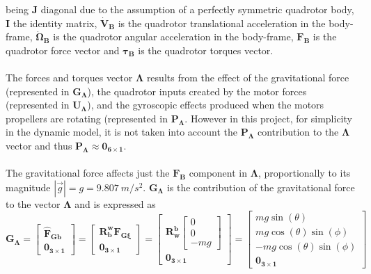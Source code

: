 being $\mathbf{J}$ diagonal due to the assumption of a perfectly symmetric quadrotor body, $\mathbf{I}$ the identity matrix, $\mathbf{\dot{V}_{B}}$ is the quadrotor translational acceleration in the body-frame, $\mathbf{\dot{\Omega}_B}$ is the quadrotor angular acceleration in the body-frame, $\mathbf{F_{B}}$ is the quadrotor force vector and $\mathbf{\tau_{B}}$ is the quadrotor torques vector.
\\\\
The forces and torques vector $\mathbf{\Lambda}$ results from the effect of the gravitational force (represented in $\mathbf{G_{\Lambda}}$), the quadrotor inputs created by the motor forces (represented in $\mathbf{U_{\Lambda}}$), and the gyroscopic effects produced when the motors propellers are rotating (represented in $\mathbf{P_{\Lambda}}$. However in this project, for simplicity in the dynamic model, it is not taken into account the $\mathbf{P_{\Lambda}}$ contribution to the $\mathbf{\Lambda}$ vector and thus $\mathbf{P_{\Lambda}} \approx \mathbf{0_{6\times 1}}$.
\\\\
The gravitational force affects just the $\mathbf{F_B}$ component in $\mathbf{\Lambda}$, proportionally to its magnitude $|\vec{g}|= g = 9.807\ m/s^{2}$. $\mathbf{G_{\Lambda}}$ is the contribution of the gravitational force to the vector $\mathbf{\Lambda}$ and is expressed as 
\begin{equation}
\mathbf{G_{\Lambda}}= \begin{bmatrix}
\mathbf{\hat{F}_{Gb}} \\ \mathbf{0_{3\times 1}}
\end{bmatrix} = \begin{bmatrix}
\mathbf{R_{b}^{w}}\mathbf{F_{G\xi}} \\ \mathbf{0_{3\times 1}}
\end{bmatrix} = 
\begin{bmatrix}
\mathbf{R_{w}^{b}} 
\begin{bmatrix}
0 \\[5pt] 0 \\[5pt] -m g
\end{bmatrix} \\[5pt]
\mathbf{0_{3\times 1}}
\end{bmatrix} =\begin{bmatrix}
m g \sin(\theta) \\[5pt]
m g \cos(\theta)\sin(\phi) \\[5pt]
- m g \cos(\theta)\sin(\phi) \\[5pt]
\mathbf{0_{3\times 1}}
\end{bmatrix}
\end{equation}
